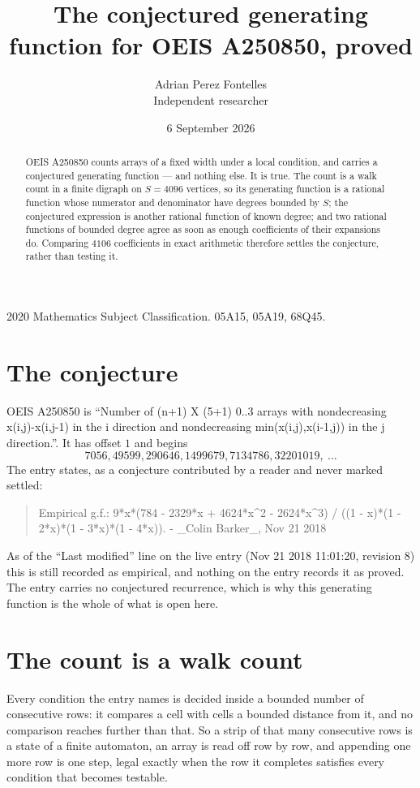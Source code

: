 \documentclass[11pt,a4paper]{article}
\title{The conjectured generating function for OEIS A250850, proved}
\author{Adrian Perez Fontelles\\ \small Independent researcher}
\date{6 September 2026}
\theoremstyle{plain}
\theoremstyle{definition}
\begin{document}
\maketitle

\begin{abstract}
OEIS A250850 counts arrays of a fixed width under a local condition, and carries a conjectured
generating function --- and nothing else. It is true. The count is a walk count in a finite
digraph on $S=4096$ vertices, so its generating function is a rational function whose numerator
and denominator have degrees bounded by $S$; the conjectured expression is another rational
function of known degree; and two rational functions of bounded degree agree as soon as enough
coefficients of their expansions do. Comparing $4106$ coefficients in exact arithmetic
therefore settles the conjecture, rather than testing it.
\end{abstract}

\noindent\small 2020 Mathematics Subject Classification. 05A15, 05A19, 68Q45.\normalsize

\section{The conjecture}

OEIS A250850 is ``Number of (n+1) X (5+1) 0..3 arrays with nondecreasing x(i,j)-x(i,j-1) in the i direction and nondecreasing min(x(i,j),x(i-1,j)) in the j direction.''. It has offset $1$ and begins
\[
7056, 49599, 290646, 1499679, 7134786, 32201019,\ \dots
\]
The entry states, as a conjecture contributed by a reader and never marked settled:
\begin{quote}
Empirical g.f.: 9*x*(784 - 2329*x + 4624*x\^{}2 - 2624*x\^{}3) / ((1 - x)*(1 - 2*x)*(1 - 3*x)*(1 - 4*x)). - \_Colin Barker\_, Nov 21 2018
\end{quote}
As of the ``Last modified'' line on the live entry (Nov 21 2018 11:01:20, revision 8) this is still
recorded as empirical, and nothing on the entry records it as proved. The entry carries no
conjectured recurrence, which is why this generating function is the whole of what is open
here.

\section{The count is a walk count}

Every condition the entry names is decided inside a bounded number of consecutive rows: it
compares a cell with cells a bounded distance from it, and no comparison reaches further than
that. So a strip of that many consecutive rows is a state of a finite automaton, an array is
read off row by row, and appending one more row is one step, legal exactly when the row it
completes satisfies every condition that becomes testable.
\end{document}

